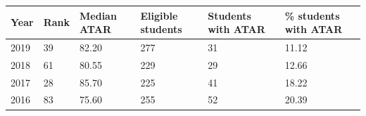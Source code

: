 \documentclass{article}
\begin{document}
\begin{tabular}{llllll}
\toprule
Year & Rank & Median ATAR & Eligible students & Students with ATAR & \% students with ATAR \\
\midrule
2019 & 39 & 82.20 & 277 & 31 & 11.12 \\
2018 & 61 & 80.55 & 229 & 29 & 12.66 \\
2017 & 28 & 85.70 & 225 & 41 & 18.22 \\
2016 & 83 & 75.60 & 255 & 52 & 20.39 \\
\bottomrule
\end{tabular}
\end{document}
